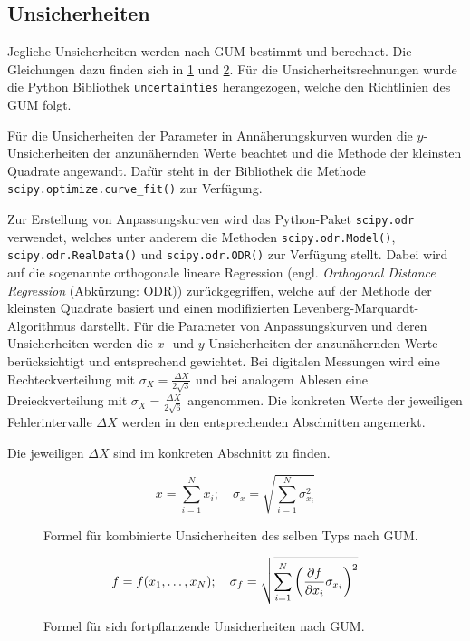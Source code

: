 \subsection{Unsicherheiten}\label{VGuD}

Jegliche Unsicherheiten werden nach GUM bestimmt und berechnet.
Die Gleichungen dazu finden sich in \cref{fig:GUM_combine} und \cref{fig:GUM_formula}.
Für die Unsicherheitsrechnungen wurde die Python Bibliothek \texttt{uncertainties} herangezogen, welche den Richtlinien des GUM folgt.

Für die Unsicherheiten der Parameter in Annäherungskurven wurden die $y$-Unsicherheiten der anzunähernden Werte beachtet und die Methode der kleinsten Quadrate angewandt.
Dafür steht in der Bibliothek die Methode \texttt{scipy.optimize.curve\_fit()} zur Verfügung.

Zur Erstellung von Anpassungskurven wird das Python-Paket \texttt{scipy.odr} verwendet, welches unter anderem die Methoden \texttt{scipy.odr.Model()}, \texttt{scipy.odr.RealData()} und \texttt{scipy.odr.ODR()} zur Verfügung stellt.
Dabei wird auf die sogenannte orthogonale lineare Regression (engl. \emph{Orthogonal Distance Regression} (Abkürzung: ODR)) zurückgegriffen, welche auf der Methode der kleinsten Quadrate basiert und einen modifizierten Levenberg-Marquardt-Algorithmus darstellt.
Für die Parameter von Anpassungskurven und deren Unsicherheiten werden die $x$- und $y$-Unsicherheiten der anzunähernden Werte berücksichtigt und entsprechend gewichtet.
Bei digitalen Messungen wird eine Rechteckverteilung mit $\sigma_X = \frac{\Delta X}{2\sqrt{3}}$ und bei analogem Ablesen eine Dreieckverteilung mit $\sigma_X = \frac{\Delta X}{2\sqrt{6}}$ angenommen.
Die konkreten Werte der jeweiligen Fehlerintervalle $\Delta X$ werden in den entsprechenden Abschnitten angemerkt.

Die jeweiligen $\Delta X$ sind im konkreten Abschnitt zu finden.

\begin{figure}[H]
	\begin{equation*}
		x = \sum_{i=1}^{N} x_i
		;\quad
		\sigma_x = \sqrt{\sum_{i = 1}^{N} \sigma_{x_i}^2}
	\end{equation*}
	\caption{Formel für kombinierte Unsicherheiten des selben Typs nach GUM.}
	\label{fig:GUM_combine}
\end{figure}

\begin{figure}[H]
	\begin{align*}
		f = f(x_1, \dots , x_N)
		;\quad
		\sigma_f = \sqrt{\sum_{i = 1}^{N}\left(\pdv{f}{x_i} \sigma_{x_i}\right) ^2}
	\end{align*}
	\caption{Formel für sich fortpflanzende Unsicherheiten nach GUM.}
	\label{fig:GUM_formula}
\end{figure}

